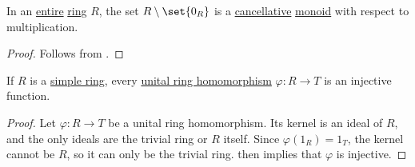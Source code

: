 \begin{proposition}\label{thm:ring_entire_iff_cancellative}
  In an \hyperref[def:entire_semiring]{entire} \hyperref[def:ring]{ring} \( R \), the set \( R \setminus \set{ 0_R } \) is a \hyperref[def:binary_operation/cancellative]{cancellative} \hyperref[def:monoid]{monoid} with respect to multiplication.
\end{proposition}
\begin{proof}
  Follows from .
\end{proof}

\begin{proposition}\label{thm:simple_ring_homomorphism_is_injective}
  If \( R \) is a \hyperref[def:simple_object]{simple ring}, every \hyperref[def:ring/homomorphism]{unital ring homomorphism} \( \varphi: R \to T \) is an injective function.
\end{proposition}
\begin{proof}
  Let \( \varphi: R \to T \) be a unital ring homomorphism. Its kernel is an ideal of \( R \), and the only ideals are the trivial ring or \( R \) itself. Since \( \varphi(1_R) = 1_T \), the kernel cannot be \( R \), so it can only be the trivial ring.  then implies that \( \varphi \) is injective.
\end{proof}

